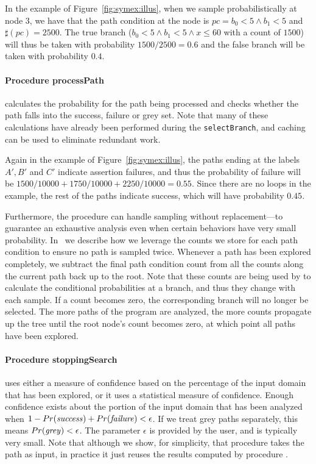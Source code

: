In the example of Figure~\ref{fig:symex:illus}, when we sample probabilistically at node $3$, we have that the path condition at the node is $pc = b_0 < 5 \wedge b_1 < 5$ and $\sharp(pc) = 2500$. 
The true branch ($b_0 < 5 \wedge b_1 < 5 \wedge x \le 60$ with a count of $1500$) will thus be taken with probability $1500/2500 = 0.6$ and the false branch will be taken with probability $0.4$.  

\paragraph{Procedure processPath} calculates the probability for the path being processed and checks whether the path falls into the success, failure or grey set. Note that many of these calculations have already been performed during the {\tt selectBranch}, and caching can be used to eliminate redundant work. 

Again in the example of Figure~\ref{fig:symex:illus}, the paths ending at the labels $A', B'$ and $C'$ indicate assertion failures, and thus the probability of failure will be $1500/10000 + 1750/10000 + 2250/10000 = 0.55$.  Since there are no loops in the example, the rest of the paths indicate success, which will have probability $0.45$.

Furthermore, the procedure can handle sampling without replacement---to guarantee an exhaustive analysis even when certain behaviors have very small probability. 
In~\cite{filieri2014statistical} we describe how we leverage the counts we store for each path condition to ensure no path is sampled twice. Whenever a path has been explored completely, 
we subtract the final path condition count from all the counts along the current path back up to the root. Note that these counts are being used by  to calculate the conditional probabilities at a branch, and thus they change with each sample. If a count becomes zero, the corresponding branch will no longer be selected. The more paths of the program are analyzed, 
the more counts propagate up the tree until the root node's count becomes zero, at which point all paths have been explored. 

\paragraph{Procedure stoppingSearch} uses either a measure of confidence based on the percentage of the input domain that has been explored, or it uses a statistical measure of confidence. 
Enough confidence exists about the portion of the input domain that has been analyzed when  $1 - Pr(\mathit{success}) + Pr(\mathit{failure}) < \epsilon$.  If we treat grey paths separately, this means $Pr(\mathit{grey}) < \epsilon$. The parameter $\epsilon$ is provided by the user, and is typically very small. Note that although we show, for simplicity, that procedure  
takes the path as input, in practice it just reuses the results computed by procedure . 


